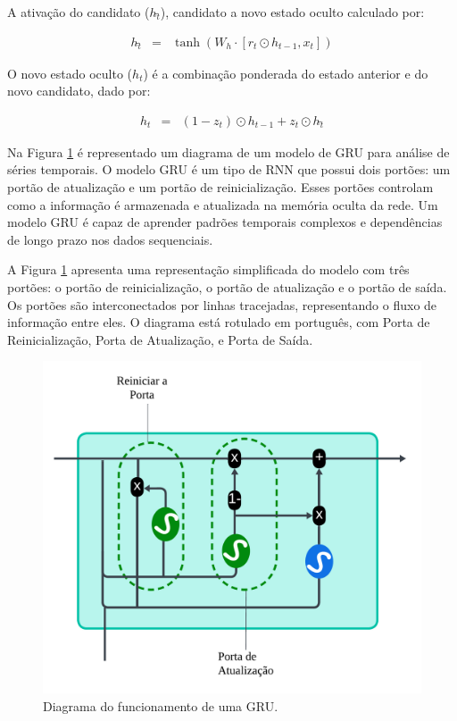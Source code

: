A ativação do candidato (\(h\widetilde{_t}\)), candidato a novo estado oculto calculado por:
 	
 	\begin{eqnarray}
 		h\widetilde{_t} &=& \tanh\left(W_h \cdot [r_t \odot h_{t-1}, x_t]\right)\label{eq:gru2}
 	\end{eqnarray}
 	
O novo estado oculto (\(h_t\)) é a combinação ponderada do estado anterior e do novo candidato, dado por:
 
 	\begin{eqnarray}
 		h_t &=& (1 - z_t) \odot h_{t-1} + z_t \odot h\widetilde{_t}\label{eq:gru3}
 	\end{eqnarray}
 
 Na Figura \ref{fig:gru} é representado um diagrama de um modelo de GRU para análise de séries temporais. O modelo GRU é um tipo de RNN que possui dois portões: um portão de atualização e um portão de reinicialização. Esses portões controlam como a informação é armazenada e atualizada na memória oculta da rede. Um modelo GRU é capaz de aprender padrões temporais complexos e dependências de longo prazo nos dados sequenciais. 
 
 A Figura \ref{fig:gru} apresenta uma representação simplificada do modelo com três portões: o portão de reinicialização, o portão de atualização e o portão de saída. Os portões são interconectados por linhas tracejadas, representando o fluxo de informação entre eles. O diagrama está rotulado em português, com Porta de Reinicialização, Porta de Atualização, e Porta de Saída\cite{Saranya2020, Jordan2021, Khan2022}.
 
 \begin{figure}[!htb]
 \centering
 \caption{Diagrama do funcionamento de uma GRU.}
 \label{fig:gru}
 \includegraphics[width=0.5\linewidth]{Modelos/Figuras/gru.pdf}
\end{figure}
 
